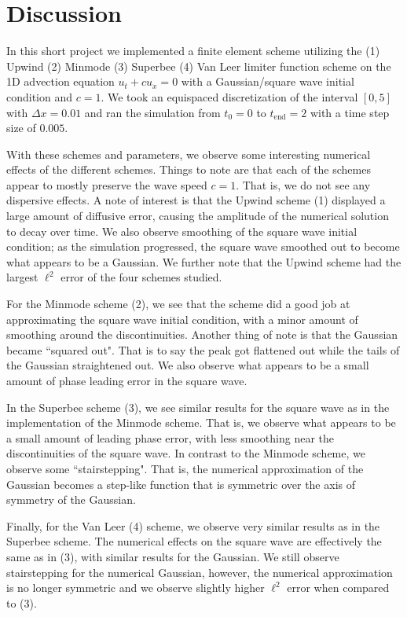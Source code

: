 \documentclass{article}
\begin{document}
\pagebreak
\section*{Discussion}
In this short project we implemented a finite element scheme utilizing the (1) Upwind (2) Minmode (3) Superbee (4) Van Leer limiter function scheme on the 1D advection equation $u_t + cu_x = 0$ with a Gaussian/square wave initial condition and $c = 1$. We took an equispaced discretization of the interval $[0,5]$ with $\Delta x = 0.01$ and ran the simulation from $t_0 = 0$ to $t_{\text{end}} = 2$ with a time step size of $0.005$.

    With these schemes and parameters, we observe some interesting numerical effects of the different schemes. Things to note are that each of the schemes appear to mostly preserve the wave speed $c = 1$. That is, we do not see any dispersive effects.  A note of interest is that the Upwind scheme (1) displayed a large amount of diffusive error, causing the amplitude of the numerical solution to decay over time. We also observe smoothing of the square wave initial condition; as the simulation progressed, the square wave smoothed out to become what appears to be a Gaussian. We further note that the Upwind scheme had the largest $\ell^2$ error of the four schemes studied.

    For the Minmode scheme (2), we see that the scheme did a good job at approximating the square wave initial condition, with a minor amount of smoothing around the discontinuities. Another thing of note is that the Gaussian became ``squared out". That is to say the peak got flattened out while the tails of the Gaussian straightened out. We also observe what appears to be a small amount of phase leading error in the square wave.

    In the Superbee scheme (3), we see similar results for the square wave as in the implementation of the Minmode scheme. That is, we observe what appears to be a small amount of leading phase error, with less smoothing near the discontinuities of the square wave. In contrast to the Minmode scheme, we observe some ``stairstepping". That is, the numerical approximation of the Gaussian becomes a step-like function that is symmetric over the axis of symmetry of the Gaussian.

    Finally, for the Van Leer (4) scheme, we observe very similar results as in the Superbee scheme. The numerical effects on the square wave are effectively the same as in (3), with similar results for the Gaussian. We still observe stairstepping for the numerical Gaussian, however, the numerical approximation is no longer symmetric and we observe slightly higher $\ell^2$ error when compared to (3).
\end{document}
